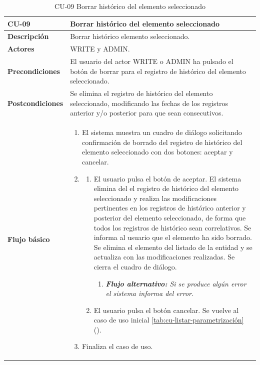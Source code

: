 \begin{table} [H]
    \centering
    \setlength{\leftmargini}{0.4cm}
	\resizebox{14cm}{!} { %
    \begin{tabular}{| m{3cm} | m{11cm} |}   
    \hline
	  \textbf{CU-09} & \textbf{Borrar histórico del elemento seleccionado} \\\hline
	  \textbf{Descripción} & Borrar histórico elemento seleccionado. \\\hline
	  \textbf{Actores} & WRITE y ADMIN. \\\hline
	  \textbf{Precondiciones} & El usuario del actor WRITE o ADMIN ha pulsado el botón de borrar para el registro de histórico del elemento seleccionado. \\\hline
	  \textbf{Postcondiciones} & Se elimina el registro de histórico del elemento seleccionado, modificando las fechas de los registros anterior y/o posterior para que sean consecutivos. \\\hline
	  \textbf{Flujo básico} & 
		\begin{enumerate}
	  	\item El sistema muestra un cuadro de diálogo solicitando confirmación de borrado del registro de histórico del elemento seleccionado con dos botones: aceptar y cancelar.
		\item 
			\begin{enumerate}	
			   \item El usuario pulsa el botón de aceptar. El sistema elimina del el registro de histórico del elemento seleccionado y realiza las modificaciones pertinentes en los registros de histórico anterior y posterior del elemento seleccionado, de forma que todos los registros de histórico sean correlativos. Se informa al usuario que el elemento ha sido borrado. Se elimina el elemento del listado de la entidad  y se actualiza con las modificaciones realizadas. Se cierra el cuadro de diálogo.
			   \begin{enumerate}	
			   \item  \textit{\textbf{Flujo alternativo:} Si se produce algún error el sistema informa del error.}
			   \end{enumerate}
			   \item El usuario pulsa el botón cancelar. Se vuelve al caso de uso inicial \ref{tab:cu-listar-parametrización} (\pageref{tab:cu-listar-parametrización}).
			\end{enumerate}
	  \item Finaliza el caso de uso.
	  \end{enumerate} 	  	  
	  \\\hline
    \end{tabular}
    } %
    \caption{CU-09 Borrar histórico del elemento seleccionado}
    \label{tab:cu-borrar-historico-elemento}
\end{table}


